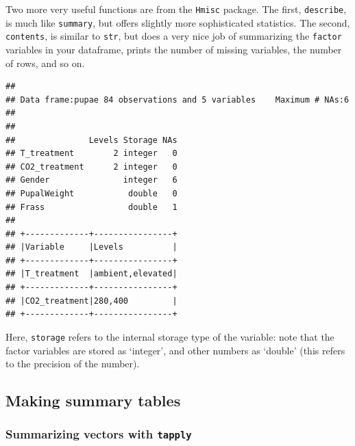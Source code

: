 \documentclass[]{book}
\newenvironment{Shaded}{\begin{snugshade}}{\end{snugshade}}
\newcommand{\CommentTok}[1]{\textcolor[rgb]{0.56,0.35,0.01}{\textit{#1}}}
\newcommand{\KeywordTok}[1]{\textcolor[rgb]{0.13,0.29,0.53}{\textbf{#1}}}
\newcommand{\NormalTok}[1]{#1}
\newcommand{\OperatorTok}[1]{\textcolor[rgb]{0.81,0.36,0.00}{\textbf{#1}}}
\newcommand{\StringTok}[1]{\textcolor[rgb]{0.31,0.60,0.02}{#1}}
\begin{document}
Two more very useful functions are from the \texttt{Hmisc} package. The first, \texttt{describe}, is much like \texttt{summary}, but offers slightly more sophisticated statistics. The second, \texttt{contents}, is similar to \texttt{str}, but does a very nice job of summarizing the \texttt{factor} variables in your dataframe, prints the number of missing variables, the number of rows, and so on.

\begin{Shaded}
\end{Shaded}

\begin{verbatim}
## 
## Data frame:pupae 84 observations and 5 variables    Maximum # NAs:6
## 
## 
##               Levels Storage NAs
## T_treatment        2 integer   0
## CO2_treatment      2 integer   0
## Gender               integer   6
## PupalWeight           double   0
## Frass                 double   1
## 
## +-------------+----------------+
## |Variable     |Levels          |
## +-------------+----------------+
## |T_treatment  |ambient,elevated|
## +-------------+----------------+
## |CO2_treatment|280,400         |
## +-------------+----------------+
\end{verbatim}

Here, \texttt{storage} refers to the internal storage type of the variable: note that the factor variables are stored as `integer', and other numbers as `double' (this refers to the precision of the number).

\hypertarget{tapplyaggregate}{%
\subsection{Making summary tables}\label{tapplyaggregate}}

\hypertarget{tapply}{%
\subsubsection{\texorpdfstring{Summarizing vectors with \texttt{tapply}}{Summarizing vectors with tapply}}\label{tapply}}
\end{document}
